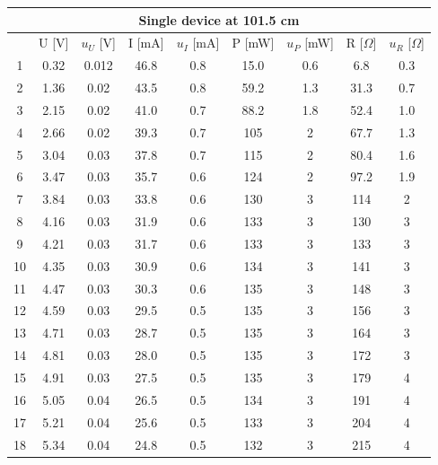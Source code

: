 \documentclass[a4paper,12pt]{article}
\begin{document}
\begin{table}[H]
\begin{center}
\begin{tabular}{|c|c|c|c|c|c|c|c|c|}
\hline
\multicolumn{9}{|c|}{Single device at 101.5 cm} \\ \hline
 & U {[}V{]} & $u_U$ {[}V{]} & I {[}mA{]} & $u_I$ {[}mA{]} & P {[}mW{]} & $u_P$ {[}mW{]} & R {[}$\Omega${]} & $u_R$ {[}$\Omega${]} \\ \hline
 1     & 0.32  & 0.012  & 46.8  & 0.8   & 15.0  & 0.6   & 6.8   & 0.3  \\ \hline
    2     & 1.36  & 0.02  & 43.5  & 0.8   & 59.2  & 1.3   & 31.3  & 0.7  \\ \hline
    3     & 2.15  & 0.02  & 41.0  & 0.7   & 88.2  & 1.8   & 52.4  & 1.0  \\ \hline
    4     & 2.66  & 0.02  & 39.3  & 0.7   & 105   & 2     & 67.7  & 1.3  \\ \hline
    5     & 3.04  & 0.03  & 37.8  & 0.7   & 115   & 2     & 80.4  & 1.6  \\ \hline
    6     & 3.47  & 0.03  & 35.7  & 0.6   & 124   & 2     & 97.2  & 1.9  \\ \hline
    7     & 3.84  & 0.03  & 33.8  & 0.6   & 130   & 3     & 114   & 2  \\ \hline
    8     & 4.16  & 0.03  & 31.9  & 0.6   & 133   & 3     & 130   & 3  \\ \hline
    9     & 4.21  & 0.03  & 31.7  & 0.6   & 133   & 3     & 133   & 3  \\ \hline
    10    & 4.35  & 0.03  & 30.9  & 0.6   & 134   & 3     & 141   & 3  \\ \hline
    11    & 4.47  & 0.03  & 30.3  & 0.6   & 135   & 3     & 148   & 3  \\ \hline
    12    & 4.59  & 0.03  & 29.5  & 0.5   & 135   & 3     & 156   & 3  \\ \hline
    13    & 4.71  & 0.03  & 28.7  & 0.5   & 135   & 3     & 164   & 3  \\ \hline
    14    & 4.81  & 0.03  & 28.0  & 0.5   & 135   & 3     & 172   & 3  \\ \hline
    15    & 4.91  & 0.03  & 27.5  & 0.5   & 135   & 3     & 179   & 4  \\ \hline
    16    & 5.05  & 0.04  & 26.5  & 0.5   & 134   & 3     & 191   & 4  \\ \hline
    17    & 5.21  & 0.04  & 25.6  & 0.5   & 133   & 3     & 204   & 4  \\ \hline
    18    & 5.34  & 0.04  & 24.8  & 0.5   & 132   & 3     & 215   & 4  \\ \hline

\end{tabular}
\end{center}
\end{table}
\end{document}
